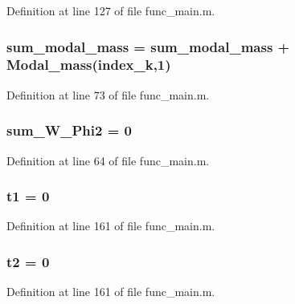 Definition at line 127 of file func\-\_\-main.\-m.

\subsubsection[{sum\-\_\-modal\-\_\-mass}]{\setlength{\rightskip}{0pt plus 5cm}sum\-\_\-modal\-\_\-mass = sum\-\_\-modal\-\_\-mass + {\bf Modal\-\_\-mass}({\bf index\-\_\-k},1)}\label{func__main_8m_afe41102d21582a0644f2bb7795f858dd}


Definition at line 73 of file func\-\_\-main.\-m.

\subsubsection[{sum\-\_\-\-W\-\_\-\-Phi2}]{\setlength{\rightskip}{0pt plus 5cm}sum\-\_\-\-W\-\_\-\-Phi2 = 0}\label{func__main_8m_ab396194af7ea5f2a640654cd83b07e1f}


Definition at line 64 of file func\-\_\-main.\-m.

\subsubsection[{t1}]{\setlength{\rightskip}{0pt plus 5cm}t1 = 0}\label{func__main_8m_a469994e78f66a44815c015b7f4b8b2f8}


Definition at line 161 of file func\-\_\-main.\-m.

\subsubsection[{t2}]{\setlength{\rightskip}{0pt plus 5cm}t2 = 0}\label{func__main_8m_a24aeadb733f27244ec14e4cba82eeee9}


Definition at line 161 of file func\-\_\-main.\-m.

